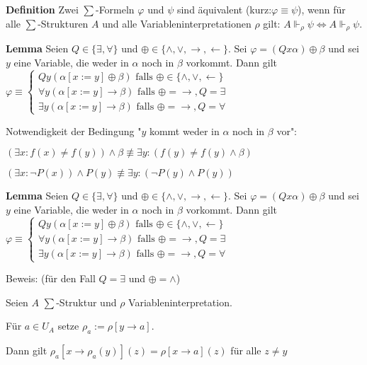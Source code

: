 \documentclass[a4paper]{article}
\renewcommand{\note}[2]{\begin{noteBox} \textbf{#1} #2 \end{noteBox}}
\begin{document}
\begin{multicols}{3}
  \note{Definition}{Zwei $\sum$-Formeln $\varphi$ und $\psi$ sind äquivalent (kurz:$\varphi\equiv\psi$), wenn für alle $\sum$-Strukturen $A$ und alle Variableninterpretationen $\rho$ gilt: $A\Vdash_{\rho}\psi\Leftrightarrow A\Vdash_{\rho}\psi$.}

  \note{Lemma}{Seien $Q\in\{\exists ,\forall\}$ und $\oplus\in\{\wedge,\vee,\rightarrow,\leftarrow\}$. Sei $\varphi= (Qx \alpha)\oplus\beta$ und sei $y$ eine Variable, die weder in $\alpha$ noch in $\beta$ vorkommt. Dann gilt $\varphi \equiv \begin{cases} Qy(\alpha[x:=y]\oplus\beta) \text{ falls } \oplus\in\{\wedge,\vee,\leftarrow\}\\ \forall y(\alpha[x:=y]\rightarrow\beta) \text{ falls } \oplus=\rightarrow,Q=\exists \\ \exists y(\alpha[x:=y]\rightarrow\beta) \text{ falls }\oplus=\rightarrow,Q=\forall\end{cases}$}

  Notwendigkeit der Bedingung "$y$ kommt weder in $\alpha$ noch in $\beta$ vor":
  \begin{itemize*}
    \item $(\exists x:f(x) \not =f(y))\wedge\beta \not\equiv\exists y: (f(y) \not =f(y)\wedge\beta)$
    \item $(\exists x:\lnot P(x))\wedge P(y)\not\equiv \exists y: (\lnot P(y) \wedge P(y))$
  \end{itemize*}

  \note{Lemma}{Seien $Q\in\{\exists,\forall\}$ und $\oplus\in\{\wedge,\vee,\rightarrow,\leftarrow\}$. Sei $\varphi= (Qx\alpha)\oplus\beta$ und sei $y$ eine Variable, die weder in $\alpha$ noch in $\beta$ vorkommt. Dann gilt $\varphi\equiv\begin{cases} Qy(\alpha[x:=y]\oplus\beta) \text{ falls }\oplus\in\{\wedge,\vee,\leftarrow\} \\ \forall y(\alpha[x:=y]\rightarrow\beta) \text{ falls }\oplus=\rightarrow,Q=\exists \\ \exists y(\alpha[x:=y]\rightarrow\beta) \text{ falls }\oplus=\rightarrow,Q=\forall \end{cases}$}

  Beweis: (für den Fall $Q=\exists$ und $\oplus=\wedge$)
  \begin{itemize*}
    \item Seien $A$ $\sum$-Struktur und $\rho$ Variableninterpretation.
    \item Für $a\in U_A$ setze $\rho_a:=\rho[y\rightarrow a]$.
    \item Dann gilt $\rho_a[x\rightarrow \rho_a(y)](z) =\rho[x\rightarrow a](z)$ für alle $z\not=y$
  \end{itemize*}



\end{multicols}
\end{document}
